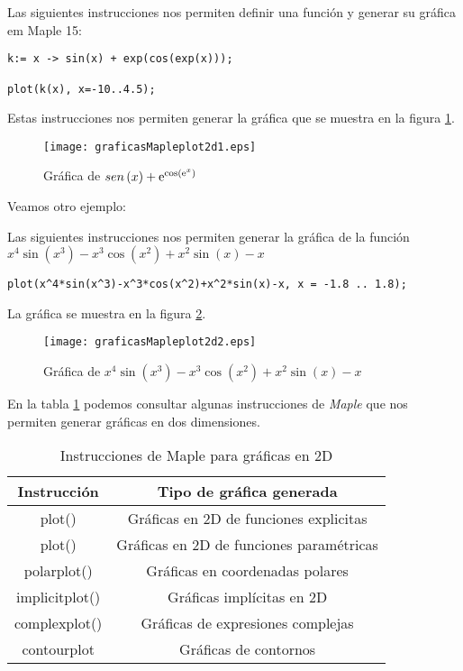 \documentclass[letterpaper,12pt]{book}
\begin{document}
Las siguientes instrucciones nos permiten definir una función y generar su gráfica 
em Maple 15:

\begin{verbatim}
k:= x -> sin(x) + exp(cos(exp(x)));

plot(k(x), x=-10..4.5);
\end{verbatim}

Estas instrucciones nos permiten generar la gráfica que se muestra en la figura \ref{cap1f1}.

\begin{figure}[h!]
\centering
\texttt{[image: graficasMapleplot2d1.eps]}
\caption{Gráfica de $sen \left( x \right) +{{\rm e}^{\cos \left( {{\rm e}^{x}} \right) }}$}\label{cap1f1}
\end{figure}

Veamos otro ejemplo:

Las siguientes instrucciones nos permiten generar la gráfica de la función 
$\displaystyle {x}^{4}\sin \left( {x}^{3} \right) -{x}^{3}\cos \left( {x}^{2}
 \right) +{x}^{2}\sin \left( x \right) -x$

\begin{verbatim}
plot(x^4*sin(x^3)-x^3*cos(x^2)+x^2*sin(x)-x, x = -1.8 .. 1.8);
\end{verbatim}

La gráfica se muestra en la figura \ref{cap1f2}.

\begin{figure}[h!]
\centering
\texttt{[image: graficasMapleplot2d2.eps]}
\caption{Gráfica de ${x}^{4}\sin \left( {x}^{3} \right) -{x}^{3}\cos \left( {x}^{2}
 \right) +{x}^{2}\sin \left( x \right) -x$}\label{cap1f2}
\end{figure}

En la tabla \ref{tab:cap1t1} podemos consultar algunas instrucciones de \emph{Maple} que nos
permiten generar gráficas en dos dimensiones.

\begin{table}[h!]
	\caption{Instrucciones de Maple para gráficas en 2D}
	\begin{center}
		\begin{tabular}{|c|c|} \hline
			Instrucción & Tipo de gráfica generada \\ \hline
			plot() & Gráficas en 2D de funciones explicitas \\ \hline
			plot() & Gráficas en 2D de funciones paramétricas \\ \hline
			polarplot() & Gráficas en coordenadas polares \\ \hline
			implicitplot() & Gráficas implícitas en 2D \\ \hline
			complexplot() & Gráficas de expresiones complejas \\ \hline
			contourplot & Gráficas de contornos \\\hline
		\end{tabular}
	\end{center}
	\label{tab:cap1t1}
\end{table}
\end{document}
